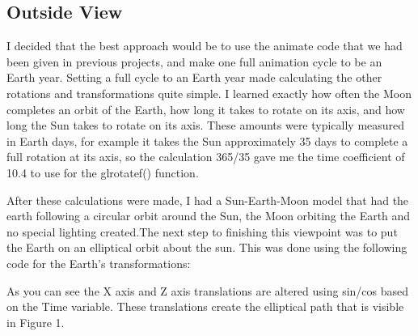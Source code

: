 \documentclass[12pt,serif,draftclsnofoot,onecolumn]{IEEEtran}
\begin{document}
	\subsection{Outside View}
	\par		
			 I decided that the best approach would be to use the animate code that we had been given in previous projects, and make one full animation cycle to be an Earth year. Setting a full cycle to an Earth year made calculating the other rotations and transformations quite simple. I learned exactly how often the Moon completes an orbit of the Earth, how long it takes to rotate on its axis, and how long the Sun takes to rotate on its axis. These amounts were typically measured in Earth days, for example it takes the Sun approximately 35 days to complete a full rotation at its axis, so the calculation 365/35 gave me the time coefficient of 10.4 to use for the glrotatef() function.
	\newline
	\par
			After these calculations were made, I had a Sun-Earth-Moon model that had the earth following a circular orbit around the Sun, the Moon orbiting the Earth and no special lighting created.The next step to finishing this viewpoint was to put the Earth on an elliptical orbit about the sun. This was done using the following code for the Earth's transformations:
	\newline
	
			As you can see the X axis and Z axis translations are altered using sin/cos based on the Time variable. These translations create the elliptical path that is visible in Figure 1.
\end{document}
